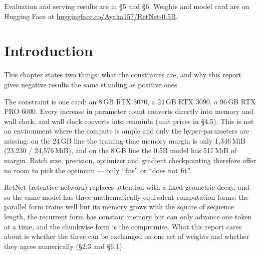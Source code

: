 \documentclass[11pt,openany]{article}
\begin{document}
Evaluation and serving results are in \S5 and \S6. Weights and model card are on Hugging Face at
\href{https://huggingface.co/Ayaka157/RetNet-0.5B}{huggingface.co/Ayaka157/RetNet-0.5B}.

\clearpage

\renewcommand{\contentsname}{Contents}
\tableofcontents

\clearpage


%

\section{Introduction}

This chapter states two things: what the constraints are, and why this report gives negative
results the same standing as positive ones.

The constraint is one card: an 8\,GB RTX 3070, a 24\,GB RTX 3090, a 96\,GB RTX PRO 6000. Every
increase in parameter count converts directly into memory and wall clock, and wall clock converts
into renminbi (unit prices in \S4.5). This is not an environment where the compute is ample and
only the hyper-parameters are missing: on the 24\,GB line the training-time memory margin is only
1{,}346\,MiB (23{,}230 / 24{,}576\,MiB), and on the 8\,GB line the 0.5B model has 517\,MiB of
margin. Batch size, precision, optimizer and gradient checkpointing therefore offer no room to
pick the optimum --- only ``fits'' or ``does not fit''.

RetNet (retentive network) replaces attention with a fixed geometric decay, and so the same model
has three mathematically equivalent computation forms: the parallel form trains well but its
memory grows with the square of sequence length, the recurrent form has constant memory but can
only advance one token at a time, and the chunkwise form is the compromise. What this report
cares about is whether the three can be exchanged on one set of weights and whether they agree
numerically (\S2.3 and \S6.1).
\end{document}
